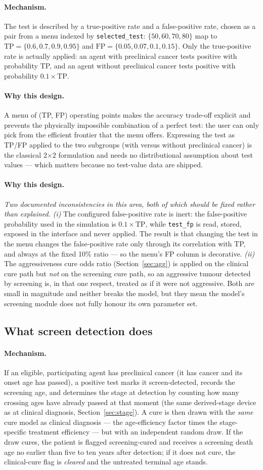 \documentclass[12pt,a4paper]{article}
\newcommand{\id}[1]{\texttt{#1}}
\newcommand{\mech}[1]{\paragraph{Mechanism.} #1}
\newcommand{\why}[1]{\paragraph{Why this design.} #1}
\begin{document}
\mech{The test is described by a true-positive rate and a false-positive rate, chosen as a pair from a
menu indexed by \id{selected\_test}: $\{50,60,70,80\}$ map to
$\text{TP} = \{0.6,0.7,0.9,0.95\}$ and $\text{FP} = \{0.05,0.07,0.1,0.15\}$. Only the true-positive rate
is actually applied: an agent with preclinical cancer tests positive with probability TP, and an agent
without preclinical cancer tests positive with probability $0.1\times\text{TP}$.}

\why{A menu of (\mbox{TP}, \mbox{FP}) operating points makes the accuracy trade-off explicit and prevents
the physically impossible combination of a perfect test: the user can only pick from the efficient
frontier that the menu offers. Expressing the test as TP/FP applied to the two subgroups (with versus
without preclinical cancer) is the classical 2$\times$2 formulation and needs no distributional assumption
about test values --- which matters because no test-value data are shipped.}

\why{\emph{Two documented inconsistencies in this area, both of which should be fixed rather than
explained.} \emph{(i)} The configured false-positive rate is inert: the false-positive probability used in
the simulation is $0.1\times\text{TP}$, while \id{test\_fp} is read, stored, exposed in the interface and
never applied. The result is that changing the test in the menu changes the false-positive rate only
through its correlation with TP, and always at the fixed 10\% ratio --- so the menu's FP column is
decorative. \emph{(ii)} The aggressiveness cure odds ratio (Section~\ref{sec:agg}) is applied on the
clinical cure path but \emph{not} on the screening cure path, so an aggressive tumour detected by screening
is, in that one respect, treated as if it were not aggressive. Both are small in magnitude and neither
breaks the model, but they mean the model's screening module does not fully honour its own parameter set.}

\subsection{What screen detection does}

\mech{If an eligible, participating agent has preclinical cancer (it has cancer and its onset age has
passed), a positive test marks it screen-detected, records the screening age, and determines the stage at
detection by counting how many crossing ages have already passed at that moment (the same derived-stage
device as at clinical diagnosis, Section~\ref{sec:stage}). A cure is then drawn with the \emph{same} cure
model as clinical diagnosis --- the age-efficiency factor times the stage-specific treatment efficiency ---
but with an independent random draw. If the draw cures, the patient is flagged screening-cured and receives
a screening death age no earlier than five to ten years after detection; if it does not cure, the
clinical-cure flag is \emph{cleared} and the untreated terminal age stands.}
\end{document}
